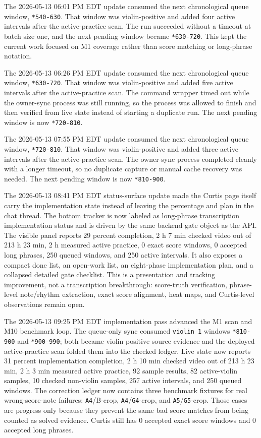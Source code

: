 The 2026-05-13 06:01 PM EDT update consumed the next chronological queue window, \texttt{*540-630}. That window was violin-positive and added four active intervals after the active-practice scan. The run succeeded without a timeout at batch size one, and the next pending window became \texttt{*630-720}. This kept the current work focused on M1 coverage rather than score matching or long-phrase notation.

The 2026-05-13 06:26 PM EDT update consumed the next chronological queue window, \texttt{*630-720}. That window was violin-positive and added five active intervals after the active-practice scan. The command wrapper timed out while the owner-sync process was still running, so the process was allowed to finish and then verified from live state instead of starting a duplicate run. The next pending window is now \texttt{*720-810}.

The 2026-05-13 07:55 PM EDT update consumed the next chronological queue window, \texttt{*720-810}. That window was violin-positive and added three active intervals after the active-practice scan. The owner-sync process completed cleanly with a longer timeout, so no duplicate capture or manual cache recovery was needed. The next pending window is now \texttt{*810-900}.

The 2026-05-13 08:41 PM EDT status-surface update made the Curtis page itself carry the implementation state instead of leaving the percentage and plan in the chat thread. The bottom tracker is now labeled as long-phrase transcription implementation status and is driven by the same backend gate object as the API. The visible panel reports 29 percent completion, 2 h 7 min checked video out of 213 h 23 min, 2 h measured active practice, 0 exact score windows, 0 accepted long phrases, 250 queued windows, and 250 active intervals. It also exposes a compact done list, an open-work list, an eight-phase implementation plan, and a collapsed detailed gate checklist. This is a presentation and tracking improvement, not a transcription breakthrough: score-truth verification, phrase-level note/rhythm extraction, exact score alignment, heat maps, and Curtis-level observations remain open.

The 2026-05-13 09:25 PM EDT implementation pass advanced the M1 scan and M10 benchmark loop. The queue-only sync consumed \texttt{violin 1} windows \texttt{*810-900} and \texttt{*900-990}; both became violin-positive source evidence and the deployed active-practice scan folded them into the checked ledger. Live state now reports 31 percent implementation completion, 2 h 10 min checked video out of 213 h 23 min, 2 h 3 min measured active practice, 92 sample results, 82 active-violin samples, 10 checked non-violin samples, 257 active intervals, and 250 queued windows. The correction ledger now contains three benchmark fixtures for real wrong-score-note failures: \texttt{A4}/B-crop, \texttt{A4}/\texttt{G4}-crop, and \texttt{A5}/\texttt{G5}-crop. Those cases are progress only because they prevent the same bad score matches from being counted as solved evidence. Curtis still has 0 accepted exact score windows and 0 accepted long phrases.

